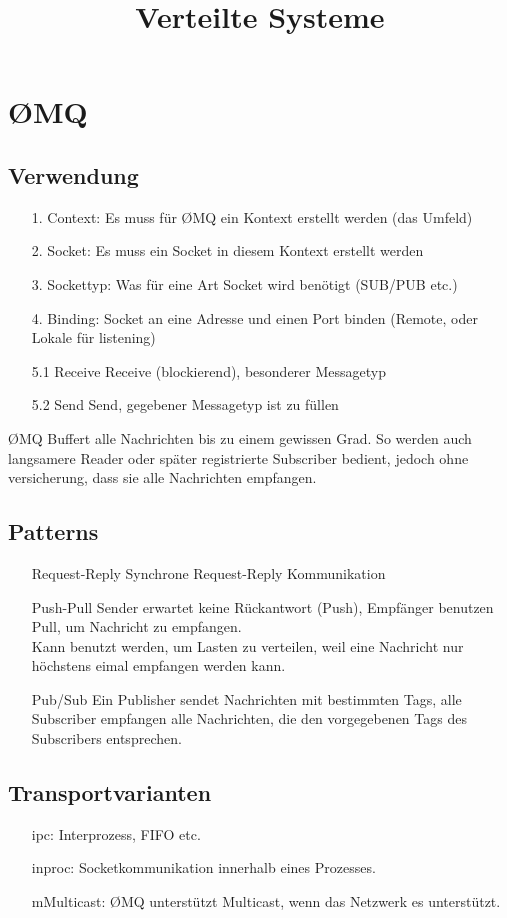 \documentclass[a4paper]{article}
\begin{document}
\title{Verteilte Systeme}
\maketitle
\section{ØMQ}
\subsection{Verwendung}
\begin{itemize}
\item[1. Context:] Es muss für ØMQ ein Kontext erstellt werden (das Umfeld)
\item[2. Socket:] Es muss ein Socket in diesem Kontext erstellt werden
\item[3. Sockettyp:] Was für eine Art Socket wird benötigt (SUB/PUB etc.)
\item[4. Binding:] Socket an eine Adresse und einen Port binden (Remote, oder Lokale für listening)
\item[5.1 Receive] Receive (blockierend), besonderer Messagetyp
\item[5.2 Send] Send, gegebener Messagetyp ist zu füllen

\end{itemize}
ØMQ Buffert alle Nachrichten bis zu einem gewissen Grad. So werden auch langsamere Reader oder später registrierte Subscriber bedient, jedoch ohne versicherung, dass sie alle Nachrichten empfangen.
\subsection{Patterns}
\begin{itemize}
\item[Request-Reply] Synchrone Request-Reply Kommunikation
\item[Push-Pull] Sender erwartet keine Rückantwort (Push), Empfänger benutzen Pull, um Nachricht zu empfangen.\\
Kann benutzt werden, um Lasten zu verteilen, weil eine Nachricht nur höchstens eimal empfangen werden kann.
\item[Pub/Sub] Ein Publisher sendet Nachrichten mit bestimmten Tags, alle Subscriber empfangen alle Nachrichten, die den vorgegebenen Tags des Subscribers entsprechen.
\end{itemize}
\subsection{Transportvarianten}
\begin{itemize}
\item[ipc:] Interprozess, FIFO etc.
\item[inproc:] Socketkommunikation innerhalb eines Prozesses.
\item[mMulticast:] ØMQ unterstützt Multicast, wenn das Netzwerk es unterstützt.
\end{itemize}
\end{document}
